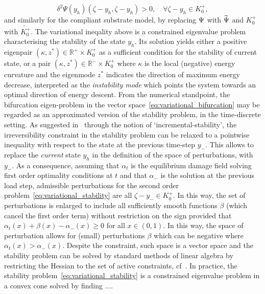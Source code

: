 \newcommand{\conespace}{K^+_{0}}
\begin{equation}
     \label{eq:variational_stability}
     \delta^2 \Psi(y_h)(\zeta - y_h,  \zeta - y_h)  > 0, \quad \forall \zeta-y_h \in \conespace,
 \end{equation}
and similarly for the compliant substrate model, by replacing $\Psi$ with $\widetilde\Psi$ and $\conespace$ with $\widetilde{\conespace}$.
The variational ineqality above is a constrained eigenvalue problem characterising the stability of the state $y_h$. Its solution yields either a positive eigenpair $(\kappa, z^*)\in \mathbb{R}^+\times K^+_0$ as a sufficient condition for the stability of current state, or a pair $(\kappa, z^*)\in \mathbb{R}^-\times K^+_0$ where $\kappa$ is the local (negative) energy curvature and the eigenmode $z^*$ indicates the direction of maximum energy decrease, interpreted as the \emph{instability mode} which points the system towards an optimal direction of energy descent. 
From the numerical standpoint, the bifurcation eigen-problem in the vector space~\eqref{eq:variational_bifurcation} may be regarded as an approximated version of the stability problem, in the time-discrete setting. As suggested in~\cite{Baldelli2021-gc} through the notion of `incremental-stability', the irreversibility constraint in the stability problem can be relaxed to a pointwise inequality with respect to the state at the previous time-step $y_-$.
This allows to replace the \emph{current} state $y_h$ in the definition of the space of perturbations, with $y_-$. As a consequence, assuming that $\alpha_t$ is the equilibrium damage field solving first order optimality conditions at $t$ and that $\alpha_-$ is the solution at the previous load step, admissible perturbations for the second order problem~\eqref{eq:variational_stability} are all $\zeta-y_-\in \conespace$. In this way, the set of perturbations is enlarged to include all sufficiently smooth functions $\beta$ (which cancel the first order term) without restriction on the sign provided that $\alpha_t(x) + \beta(x) - \alpha_-(x)\geq 0$ for all $x\in (0, 1)$.
% 
In this way, the space of perturbation allows for (small) perturbations $\beta$ which can be negative where $\alpha_t(x)>\alpha_-(x)$. Despite the constraint, such space is a vector space and the stability problem can be solved by standard methods of linear algebra by restricting the Hessian to the set of active constraints, cf~\cite{Nocedal1999-zr}.
In practice, the stability problem~\eqref{eq:variational_stability} is a constrained eigenvalue problem in a convex cone solved by finding ....




